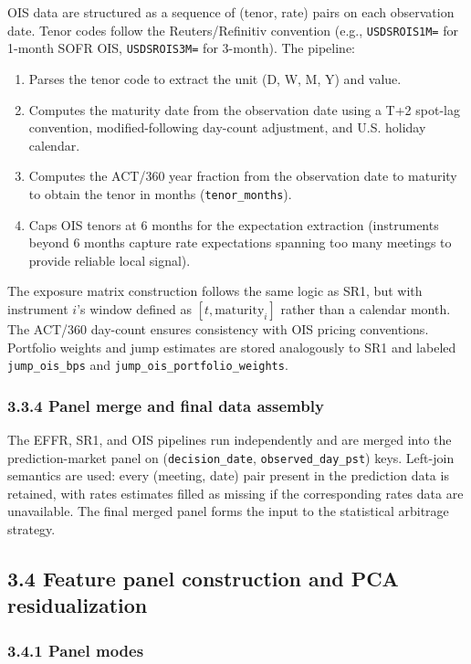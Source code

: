 OIS data are structured as a sequence of (tenor, rate) pairs on each observation date. Tenor codes follow the Reuters/Refinitiv convention (e.g., \texttt{USDSROIS1M=} for 1-month SOFR OIS, \texttt{USDSROIS3M=} for 3-month). The pipeline:
\begin{enumerate}
    \item Parses the tenor code to extract the unit (D, W, M, Y) and value.
    \item Computes the maturity date from the observation date using a T+2 spot-lag convention, modified-following day-count adjustment, and U.S. holiday calendar.
    \item Computes the ACT/360 year fraction from the observation date to maturity to obtain the tenor in months (\texttt{tenor\_months}).
    \item Caps OIS tenors at 6 months for the expectation extraction (instruments beyond 6 months capture rate expectations spanning too many meetings to provide reliable local signal).
\end{enumerate}

The exposure matrix construction follows the same logic as SR1, but with instrument $i$'s window defined as $[t, \text{maturity}_i]$ rather than a calendar month. The ACT/360 day-count ensures consistency with OIS pricing conventions. Portfolio weights and jump estimates are stored analogously to SR1 and labeled \texttt{jump\_ois\_bps} and \texttt{jump\_ois\_portfolio\_weights}.

\subsubsection*{3.3.4 Panel merge and final data assembly}

The EFFR, SR1, and OIS pipelines run independently and are merged into the prediction-market panel on (\texttt{decision\_date}, \texttt{observed\_day\_pst}) keys. Left-join semantics are used: every (meeting, date) pair present in the prediction data is retained, with rates estimates filled as missing if the corresponding rates data are unavailable. The final merged panel forms the input to the statistical arbitrage strategy.

\subsection*{3.4 Feature panel construction and PCA residualization}

\subsubsection*{3.4.1 Panel modes}

